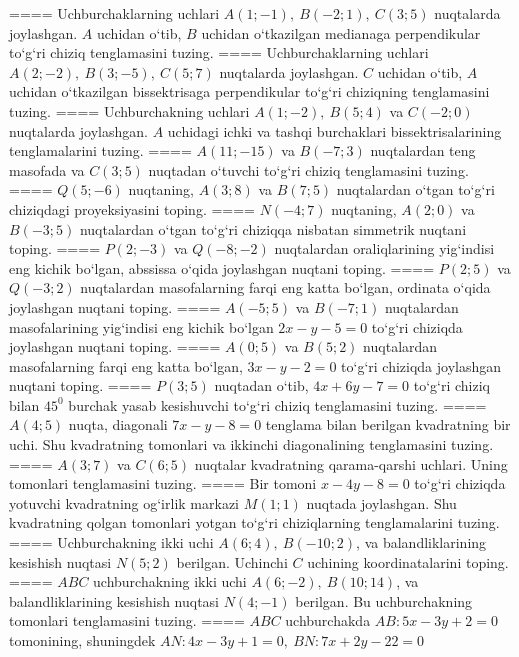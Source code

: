 ====
Uchburchaklarning uchlari
\(A (1; - 1),\ B (- 2;1),\ C (3;5) \) nuqtalarda joylashgan. $A$
uchidan o‘tib, $B$ uchidan o‘tkazilgan medianaga
perpendikular to‘g‘ri chiziq tenglamasini tuzing.
====
Uchburchaklarning uchlari
\(A (2; - 2),\ B (3; - 5),\ C (5;7) \) nuqtalarda joylashgan. $C$
uchidan o‘tib, $A$ uchidan o‘tkazilgan bissektrisaga
perpendikular to‘g‘ri chiziqning tenglamasini tuzing.
====
Uchburchakning uchlari \(A (1;-2),\ B (5; 4) \) va
\(C (-2;0) \) nuqtalarda joylashgan. $A$ uchidagi ichki va tashqi
burchaklari bissektrisalarining tenglamalarini tuzing.
====
\(A (11; - 15) \) va \(B (-7;3) \) nuqtalardan
teng masofada va \(C (3; 5) \) nuqtadan o‘tuvchi to‘g‘ri chiziq tenglamasini
tuzing.
====
\(Q (5; - 6) \) nuqtaning, \(A (3;8) \) va \(B (7;5) \)
nuqtalardan o‘tgan to‘g‘ri chiziqdagi proyeksiyasini toping.
====
\(N (- 4; 7) \) nuqtaning, \(A (2;0) \) va \(B (- 3;5) \)
nuqtalardan o‘tgan to‘g‘ri chiziqqa nisbatan simmetrik nuqtani toping.
====
\(P (2; - 3) \) va \(Q (- 8; - 2) \) nuqtalardan
oraliqlarining yig‘indisi eng kichik bo‘lgan, abssissa o‘qida joylashgan
nuqtani toping.
====
\(P (2;5) \) va \(Q (- 3;2) \) nuqtalardan masofalarning
farqi eng katta bo‘lgan, ordinata o‘qida joylashgan nuqtani toping.
====
\(A (-5;5) \) va \(B (-7;1) \) nuqtalardan
masofalarining yig‘indisi eng kichik bo‘lgan \(2x - y - 5 = 0\) to‘g‘ri chiziqda
joylashgan nuqtani toping.
====
\(A (0;5) \) va \(B (5;2) \) nuqtalardan masofalarning
farqi eng katta bo‘lgan, \(3x - y - 2 = 0\) to‘g‘ri chiziqda joylashgan
nuqtani toping.
====
\(P (3;5) \) nuqtadan o‘tib, \(4x + 6y - 7 = 0\) to‘g‘ri chiziq
bilan \(45^{0}\) burchak yasab kesishuvchi to‘g‘ri chiziq tenglamasini tuzing.
====
\(A (4;5) \) nuqta, diagonali \(7x - y - 8 = 0\) tenglama
bilan berilgan kvadratning bir uchi. Shu kvadratning tomonlari va
ikkinchi diagonalining tenglamasini tuzing.
====
\(A (3;7) \) va \(C (6; 5) \) nuqtalar kvadratning
qarama-qarshi uchlari. Uning tomonlari tenglamasini tuzing.
====
Bir tomoni \(x-4y - 8 = 0\) to‘g‘ri chiziqda yotuvchi
kvadratning og‘irlik markazi \(M (1;1) \) nuqtada joylashgan. Shu kvadratning
qolgan tomonlari yotgan to‘g‘ri chiziqlarning tenglamalarini tuzing.
====
Uchburchakning ikki uchi \(A (6;4),\ B (- 10;2) \), va
balandliklarining kesishish nuqtasi \(N (5;2) \) berilgan. Uchinchi $C$
uchining koordinatalarini toping.
====
$ABC$ uchburchakning ikki uchi
\(A (6; - 2),\ B (10;14) \), va balandliklarining kesishish nuqtasi
\(N (4; - 1) \) berilgan. Bu uchburchakning tomonlari tenglamasini tuzing.
====
$ABC$ uchburchakda \(AB:5x-3y+2=0\)
tomonining, shuningdek \(AN:4x - 3y + 1 = 0,\ BN:7x + 2y - 22 = 0\)
